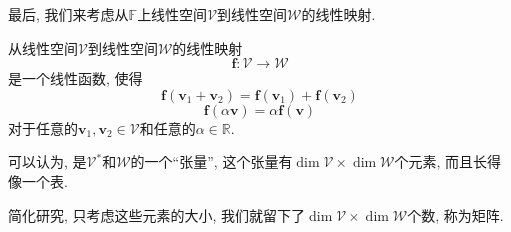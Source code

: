 \documentclass[12pt]{ctexbook}
\numberwithin{definition}{section}
\numberwithin{theorem}{section}
\numberwithin{exercise}{section}
\numberwithin{example}{section}
\numberwithin{lemma}{section}
\begin{document}
    最后, 我们来考虑从\(\mathbb{F}\)上线性空间\(\mathcal{V}\)到线性空间\(\mathcal{W}\)的线性映射.
    
    从线性空间\(\mathcal{V}\)到线性空间\(\mathcal{W}\)的线性映射
    \begin{equation}
        \boldsymbol{f}: \mathcal{V} \to \mathcal{W}
    \end{equation}
    是一个线性函数, 使得
    \begin{equation}
        \boldsymbol{f}(\boldsymbol{v}_1 + \boldsymbol{v}_2) = \boldsymbol{f}(\boldsymbol{v}_1) + \boldsymbol{f}(\boldsymbol{v}_2)
    \end{equation}
    \begin{equation}
        \boldsymbol{f}(\alpha \boldsymbol{v}) = \alpha \boldsymbol{f}(\boldsymbol{v})
    \end{equation}
    对于任意的\(\boldsymbol{v}_1, \boldsymbol{v}_2 \in \mathcal{V}\)和任意的\(\alpha \in \mathbb{R}\).

    可以认为, 是\(\mathcal{V}^*\)和\(\mathcal{W}\)的一个``张量'',
    这个张量有\(\dim {\mathcal{V}} \times \dim {\mathcal{W}}\)个元素, 而且长得像一个表.

    简化研究, 只考虑这些元素的大小, 我们就留下了\(\dim {\mathcal{V}} \times \dim {\mathcal{W}}\)个数, 称为矩阵.
\end{document}
